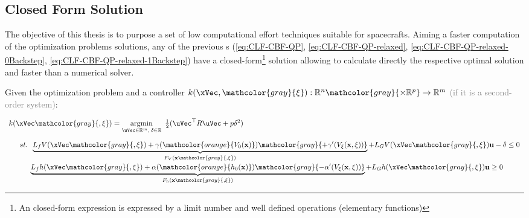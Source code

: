 \subsection{Closed Form Solution}
\label{sub:closed_form}

The objective of this thesis is to purpose a set of low computational effort techniques suitable for spacecrafts. Aiming a faster computation of the optimization problems solutions, any of the previous s (\eqref{eq:CLF-CBF-QP}, \eqref{eq:CLF-CBF-QP-relaxed}, \eqref{eq:CLF-CBF-QP-relaxed-0Backstep}, \eqref{eq:CLF-CBF-QP-relaxed-1Backstep}) have a closed-form\footnote{An closed-form expression is expressed by a limit number and well defined operations (elementary functions)} solution allowing to calculate directly the respective optimal solution and faster than a numerical solver.\par
Given the  optimization problem and a controller \(k(\xVec, \mathcolor{gray}{\mathbf{\xi}}): \mathbb{R}^n \mathcolor{gray}{\times \mathbb{R}^p} \to \mathbb{R}^m\) \textcolor{gray}{(if it is a second-order system)}:

\begin{equation}
    \begin{array}{l}
        k(\xVec \mathcolor{gray}{, \mathbf{\xi}}) = \underset{\uVec \in \mathbb{R}^m, \hspace{0.2em} \delta \in \mathbb{R}}{\mathrm{argmin}} \quad \hspace{-0.5em} \frac{1}{2} (\uVec^\top R \uVec + p\delta^2 ) \vspace{1em} \\ 
        \quad \hspace{0.5em}  st. \hspace{0.5em} \underbrace{L_fV(\xVec \mathcolor{gray}{, \mathbf{\xi}}) + \gamma(\mathcolor{orange}{V_0(\mathbf{x})}) \mathcolor{gray}{+ \gamma'(V_{\mathbf{\xi}}(\mathbf{x}, \mathbf{\xi}))}}_{F_V(\mathbf{x} \mathcolor{gray}{, \mathbf{\xi}})} + L_GV(\xVec \mathcolor{gray}{, \mathbf{\xi}})\mathbf{u} - \delta \leq  0 \vspace{0.25em}\\
        \quad \quad \hspace{1em}                 \underbrace{L_fh(\xVec \mathcolor{gray}{, \mathbf{\xi}}) + \alpha(\mathcolor{orange}{h_0(\mathbf{x})}) \mathcolor{gray}{- \alpha'(V_{\mathbf{\xi}}(\mathbf{x}, \mathbf{\xi}))}}_{F_h(\mathbf{x} \mathcolor{gray}{, \mathbf{\xi}})} + L_Gh(\xVec \mathcolor{gray}{, \mathbf{\xi}})\mathbf{u} \geq 0 
    \end{array}
 \label{eq:CLF-CBF-QP-relaxed-generic}
\end{equation}

